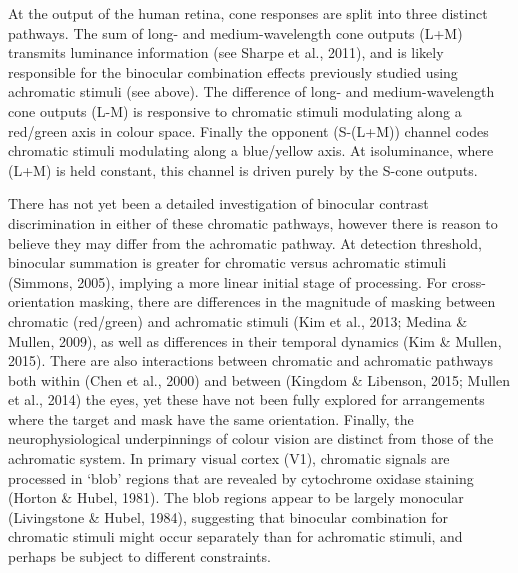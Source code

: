 \documentclass[
  letterpaper,
  DIV=11,
  numbers=noendperiod]{scrartcl}
\begin{document}
At the output of the human retina, cone responses are split into three
distinct pathways. The sum of long- and medium-wavelength cone outputs
(L+M) transmits luminance information (see Sharpe et al., 2011), and is
likely responsible for the binocular combination effects previously
studied using achromatic stimuli (see above). The difference of long-
and medium-wavelength cone outputs (L-M) is responsive to chromatic
stimuli modulating along a red/green axis in colour space. Finally the
opponent (S-(L+M)) channel codes chromatic stimuli modulating along a
blue/yellow axis. At isoluminance, where (L+M) is held constant, this
channel is driven purely by the S-cone outputs.

There has not yet been a detailed investigation of binocular contrast
discrimination in either of these chromatic pathways, however there is
reason to believe they may differ from the achromatic pathway. At
detection threshold, binocular summation is greater for chromatic versus
achromatic stimuli (Simmons, 2005), implying a more linear initial stage
of processing. For cross-orientation masking, there are differences in
the magnitude of masking between chromatic (red/green) and achromatic
stimuli (Kim et al., 2013; Medina \& Mullen, 2009), as well as
differences in their temporal dynamics (Kim \& Mullen, 2015). There are
also interactions between chromatic and achromatic pathways both within
(Chen et al., 2000) and between (Kingdom \& Libenson, 2015; Mullen et
al., 2014) the eyes, yet these have not been fully explored for
arrangements where the target and mask have the same orientation.
Finally, the neurophysiological underpinnings of colour vision are
distinct from those of the achromatic system. In primary visual cortex
(V1), chromatic signals are processed in `blob' regions that are
revealed by cytochrome oxidase staining (Horton \& Hubel, 1981). The
blob regions appear to be largely monocular (Livingstone \& Hubel,
1984), suggesting that binocular combination for chromatic stimuli might
occur separately than for achromatic stimuli, and perhaps be subject to
different constraints.
\end{document}
